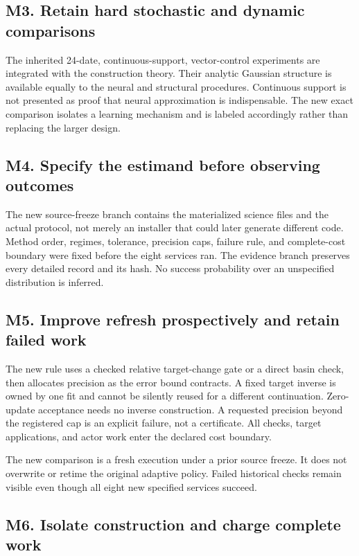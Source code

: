 \documentclass[ecta,nameyear,draft]{econsocart}
\theoremstyle{definition}
\theoremstyle{remark}
\begin{document}
\subsection*{M3. Retain hard stochastic and dynamic comparisons}

The inherited 24-date, continuous-support, vector-control experiments are integrated with the construction theory. Their analytic Gaussian structure is available equally to the neural and structural procedures. Continuous support is not presented as proof that neural approximation is indispensable. The new exact comparison isolates a learning mechanism and is labeled accordingly rather than replacing the larger design.

\subsection*{M4. Specify the estimand before observing outcomes}

The new source-freeze branch contains the materialized science files and the actual protocol, not merely an installer that could later generate different code. Method order, regimes, tolerance, precision caps, failure rule, and complete-cost boundary were fixed before the eight services ran. The evidence branch preserves every detailed record and its hash. No success probability over an unspecified distribution is inferred.

\subsection*{M5. Improve refresh prospectively and retain failed work}

The new rule uses a checked relative target-change gate or a direct basin check, then allocates precision as the error bound contracts. A fixed target inverse is owned by one fit and cannot be silently reused for a different continuation. Zero-update acceptance needs no inverse construction. A requested precision beyond the registered cap is an explicit failure, not a certificate. All checks, target applications, and actor work enter the declared cost boundary.

The new comparison is a fresh execution under a prior source freeze. It does not overwrite or retime the original adaptive policy. Failed historical checks remain visible even though all eight new specified services succeed.

\subsection*{M6. Isolate construction and charge complete work}
\end{document}
